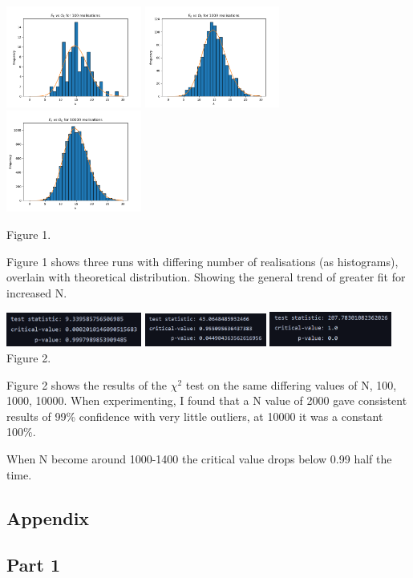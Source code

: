 \documentclass[11pt]{article}
\newcommand{\Newpage}{\end{preview}\begin{preview}}
\begin{document}
\begin{preview}
\includegraphics[width=0.333\textwidth]{inc/100.png}
\includegraphics[width=0.333\textwidth]{inc/1000.png}
\includegraphics[width=0.333\textwidth]{inc/10000.png}
\begin{center}Figure 1.\end{center}

Figure 1 shows three runs with differing number of realisations (as histograms), overlain with theoretical distribution. Showing the general trend of greater fit for increased N. \\

\begin{center}
\includegraphics[width=0.333\textwidth]{inc/100_p.png}
\includegraphics[width=0.3\textwidth]{inc/1000_p.png}
\includegraphics[width=0.3\textwidth]{inc/10000_p.png}
Figure 2.
\end{center}

Figure 2 shows the results of the $\chi^2$ test on the same differing values of N, 100, 1000, 10000.
When experimenting, I found that a N value of 2000 gave consistent results of 99\% confidence with very little outliers, at 10000 it was a constant 100\%.

When N become around 1000-1400 the critical value drops below 0.99 half the time. 

\Newpage
\section*{Appendix}
\subsection*{Part 1}

\end{preview}
\end{document}
